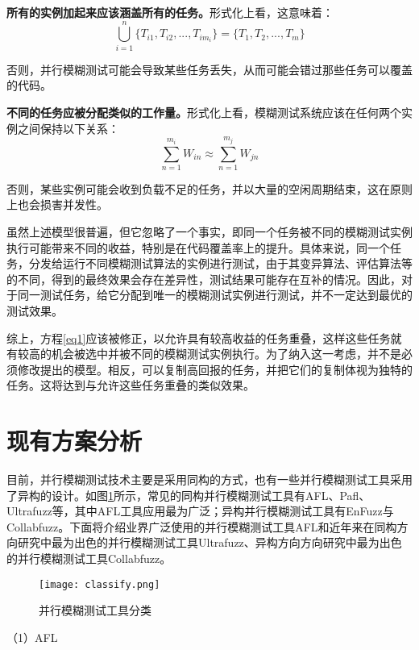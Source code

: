 \documentclass[master]{thesis-uestc}
\begin{document}
\textbf{所有的实例加起来应该涵盖所有的任务。}形式化上看，这意味着：
\begin{equation}
\bigcup_{i = 1}^{n} \{T_{i1}, T_{i2}, ..., T_{im_i}\} = \{T_{1}, T_{2}, ..., T_{m}\}
\end{equation}

否则，并行模糊测试可能会导致某些任务丢失，从而可能会错过那些任务可以覆盖的代码。

\textbf{不同的任务应被分配类似的工作量。}形式化上看，模糊测试系统应该在任何两个实例之间保持以下关系：
\begin{equation}
\sum_{n = 1}^{m_i}W_{in} \approx \sum_{n = 1}^{m_j}W_{jn} 
\end{equation}

否则，某些实例可能会收到负载不足的任务，并以大量的空闲周期结束，这在原则上也会损害并发性。

虽然上述模型很普遍，但它忽略了一个事实，即同一个任务被不同的模糊测试实例执行可能带来不同的收益，特别是在代码覆盖率上的提升。具体来说，同一个任务，分发给运行不同模糊测试算法的实例进行测试，由于其变异算法、评估算法等的不同，得到的最终效果会存在差异性，测试结果可能存在互补的情况。因此，对于同一测试任务，给它分配到唯一的模糊测试实例进行测试，并不一定达到最优的测试效果。

综上，方程\ref{eq1}应该被修正，以允许具有较高收益的任务重叠，这样这些任务就有较高的机会被选中并被不同的模糊测试实例执行。为了纳入这一考虑，并不是必须修改提出的模型。相反，可以复制高回报的任务，并把它们的复制体视为独特的任务。这将达到与允许这些任务重叠的类似效果。

\section{现有方案分析}

目前，并行模糊测试技术主要是采用同构的方式，也有一些并行模糊测试工具采用了异构的设计。如图\ref{classify}所示，常见的同构并行模糊测试工具有AFL、Pafl、Ultrafuzz等，其中AFL工具应用最为广泛；异构并行模糊测试工具有EnFuzz与Collabfuzz。下面将介绍业界广泛使用的并行模糊测试工具AFL和近年来在同构方向研究中最为出色的并行模糊测试工具Ultrafuzz、异构方向方向研究中最为出色的并行模糊测试工具Collabfuzz。

\begin{figure}[!htbp]
    \vspace{6pt}
    \centering
    \texttt{[image: classify.png]}
    \caption{并行模糊测试工具分类}
    \label{classify}
\end{figure}

（1）AFL
\end{document}
